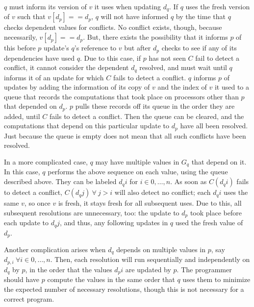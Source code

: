 \documentclass[pageno]{jpaper}
\begin{document}
$q$ must inform its version of $v$ it uses when updating $d_q$. If $q$ uses the
fresh version of $v$ such that $v[d_p] == d_p$, $q$ will not have informed $q$
by the time that $q$ checks dependent values for conflicts. No conflict exists,
though, because necessarily, $v[d_p] == d_p$. But, there exists the
possibility that it informs $p$ of this before $p$ update's $q$'s reference to
$v$ but after $d_p$ checks to see if any of its dependencies have used $q$. Due
to this case, if $p$ has not seen $C$ fail to detect a conflict, it cannot
consider the dependent $d_q$ resolved, and must wait until $q$ informs it of an
update for which $C$ fails to detect a conflict. $q$ informs $p$ of updates by
adding the information of its copy of $v$ and the index of $v$ it used to a
queue that records the computations that took place on processors other than $p$
that depended on $d_p$. $p$ pulls these records off its queue in the order they
are added, until $C$ fails to detect a conflict. Then the queue can be cleared,
and the computations that depend on this particular update to $d_p$ have all
been resolved. Just because the queue is empty does not mean that all such
conflicts have been resolved.

In a more complicated case, $q$ may have multiple values in $G_q$ that depend on
it. In this case, $q$ performs the above sequence on each value, using the queue
described above. They can be labeled $d_qi$ for $i \in 0, \dots, n$. As soon as
$C(d_qi)$ fails to detect a conflict, $C(d_qj) ~ \forall ~ j > i $ will also detect
no conflict; each $d_qi$ uses the same $v$, so once $v$ is fresh, it stays fresh
for all subsequent uses. Due to this, all subsequent resolutions are
unnecessary, too: the update to $d_p$ took place before each update to $d_qj$,
and thus, any following updates in $q$ used the fresh value of $d_p$.

Another complication arises when $d_q$ depends on multiple values in $p$, say
$d_{p,i} ~ \forall i \in 0, \dots, n$. Then, each resolution will run sequentially
and independently on $d_q$ by $p$, in the order that the values $d_pi$ are
updated by $p$. The programmer should have $p$ compute the values in the same
order that $q$ uses them to minimize the expected number of necessary
resolutions, though this is not necessary for a correct program.
\end{document}
